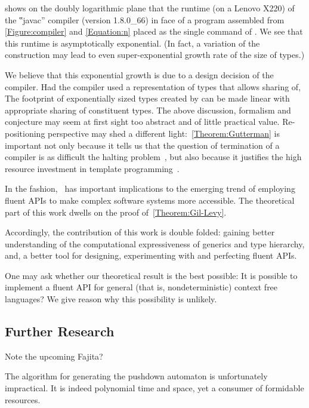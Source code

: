  shows on the doubly logarithmic plane that the runtime (on a Lenovo X220)
  of the ‟javac” compiler (version 1.8.0\_66) in face of a \Java program
  assembled from \cref{Figure:compiler} and \cref{Equation:n} placed as the
  single command of .
We see that this runtime is asymptotically exponential.
(In fact, a variation of the construction may lead to even super-exponential growth rate of the size of types.)

We believe that this exponential growth is due to a design decision of the compiler.
Had the compiler used a representation of types that allows sharing of,
The footprint of exponentially sized types created by can be made linear
  with appropriate sharing of constituent types.
The above discussion, formalism and conjecture may seem at first sight too abstract
  and of little practical value.
Re-positioning perspective may shed a different light:~\cref{Theorem:Gutterman} is important not only because it tells us
  that the question of termination of a \CC compiler is as difficult
  the halting problem~\cite{Turing:1936}, but also because it
  justifies the high resource investment in
  template programming~\cite{Musser:Stepanov:1989,Dehnert:Stepanov:2000
  ,Backhouse:Jansson:1999, Austern:1998,Bracha:Odersky:Stoutamire:Wadler:98,X:Garcia:Jarvi:Lumsdaine:Siek:Willcock:03}.

In the fashion,~ has important
  implications to the emerging trend of employing fluent APIs
  to make complex software systems more accessible.
The theoretical part of this work dwells on the proof of~\cref{Theorem:Gil-Levy}.

Accordingly, the contribution of this work is double folded:
  gaining better understanding of the computational expressiveness of
  \Java generics and type hierarchy, and, a better tool
  for designing, experimenting with and perfecting fluent APIs.

One may ask whether our theoretical result is the
  best possible:
It is possible to implement a fluent API for general
  (that is, nondeterministic) context free languages?
  We give reason why this possibility is unlikely.

\subsection{Further Research}
Note the upcoming \textsf{Fajita}?

The algorithm for generating the pushdown automaton is unfortunately impractical.
It is indeed polynomial time and space,
  yet a consumer of formidable resources.
